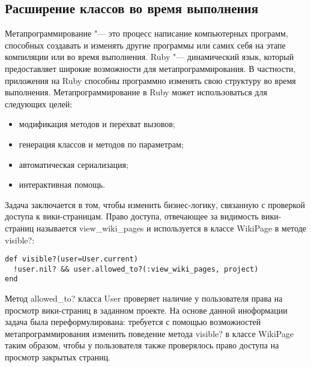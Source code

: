 \subsection{Расширение классов во время выполнения}
\label{section:metaprogramming} 
Метапрограммирование "--- это процесс написание компьютерных программ,
способных создавать и изменять другие программы или самих себя на этапе
компиляции или во время выполнения. Ruby "--- динамический язык, который
предоставляет широкие возможности для метапрограммирования. В частности,
приложения на Ruby способны программно изменять свою структуру во время
выполнения. Метапрограммирование в Ruby может использоваться для следующих
целей:
\begin{itemize}
  \item модификация методов и перехват вызовов;
  \item генерация классов и методов по параметрам;
  \item автоматическая сериализация;
  \item интерактивная помощь.
\end{itemize}

Задача заключается в том, чтобы изменить бизнес-логику, связанную с проверкой
доступа к вики-страницам. Право доступа, отвечающее за видимость вики-страниц
называется view\_wiki\_pages и используется в классе WikiPage в методе
visible?:
\small{\begin{lstlisting}
def visible?(user=User.current)
  !user.nil? && user.allowed_to?(:view_wiki_pages, project)
end
\end{lstlisting}}
Метод allowed\_to? класса User проверяет наличие у пользователя права на
просмотр вики-страниц в заданном проекте. На основе данной иноформации задача
была переформулирована: требуется с помощью возможностей метапрограммирования
изменить поведение метода visible? в классе WikiPage таким образом, чтобы у
пользователя также проверялось право доступа на просмотр закрытых страниц.

